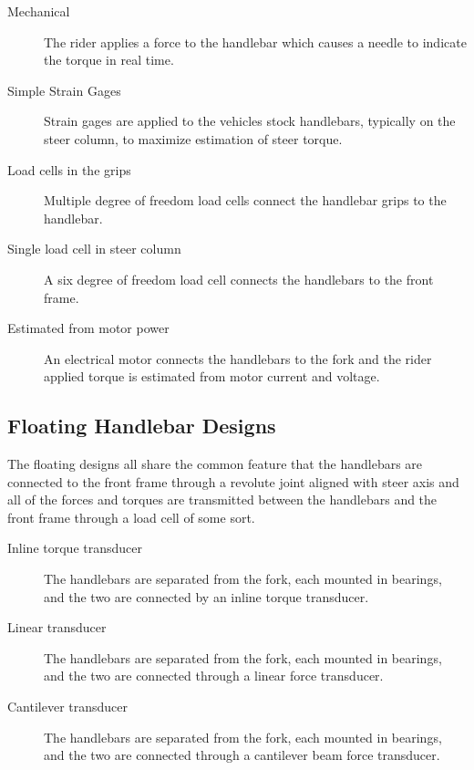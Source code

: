 \documentclass[10pt]{article}
\begin{document}
\begin{description}
  \item[Mechanical] The rider applies a force to the handlebar which causes a
    needle to indicate the torque in real
    time.~\cite{Wilson-Jones1951,Cheng2003,Moore2012}
  \item[Simple Strain Gages] Strain gages are applied to the vehicles stock
    handlebars, typically on the steer column, to maximize estimation of steer
    torque.~\cite{Eaton1973,Lorenzo1997,Capitani2006}
  \item[Load cells in the grips] Multiple degree of freedom load cells connect
    the handlebar grips to the handlebar.~\cite{Evertse2010}
  \item[Single load cell in steer column] A six degree of freedom load cell
    connects the handlebars to the front frame.~\cite{Kageyama?}
  \item[Estimated from motor power] An electrical motor connects the handlebars
    to the fork and the rider applied torque is estimated from motor current
    and voltage.~\cite{Iuchi2006,Appelman2012,Peterson2013}
\end{description}


\subsection*{Floating Handlebar Designs}

The floating designs all share the common feature that the handlebars are
connected to the front frame through a revolute joint aligned with steer axis
and all of the forces and torques are transmitted between the handlebars and the
front frame through a load cell of some sort.

\begin{description}
  \item[Inline torque transducer] The handlebars are separated from the fork,
    each mounted in bearings, and the two are connected by an inline torque
    transducer.~\cite{Weir1979a,Cain2010,Cain2012,Moore2012}
  \item[Linear transducer] The handlebars are separated from the fork, each
    mounted in bearings, and the two are connected through a linear force
    transducer.~\cite{Cheng2003,James2002,Teerhuis2010}
  \item[Cantilever transducer] The handlebars are separated from the fork, each
    mounted in bearings, and the two are connected through a cantilever beam
    force transducer.~ \cite{Bortoluzzi2000,Biral2003,Ouden2011}
\end{description}
\end{document}
